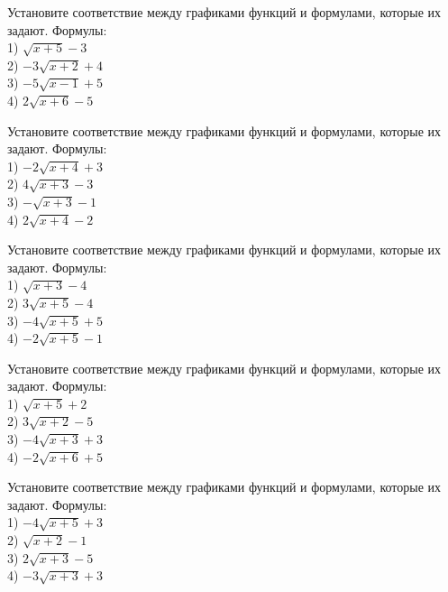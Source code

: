 \documentclass[4apaper]{article}
\begin{document}
\begin{taskBN}{56}
Установите соответствие между графиками функций и формулами, которые их задают. Формулы: \\1) $\sqrt{x+5}-3$\\2) $-3\sqrt{x+2}+4$\\3) $-5\sqrt{x-1}+5$\\4) $2\sqrt{x+6}-5$
\end{taskBN}

\begin{taskBN}{57}
Установите соответствие между графиками функций и формулами, которые их задают. Формулы: \\1) $-2\sqrt{x+4}+3$\\2) $4\sqrt{x+3}-3$\\3) $-\sqrt{x+3}-1$\\4) $2\sqrt{x+4}-2$
\end{taskBN}

\begin{taskBN}{58}
Установите соответствие между графиками функций и формулами, которые их задают. Формулы: \\1) $\sqrt{x+3}-4$\\2) $3\sqrt{x+5}-4$\\3) $-4\sqrt{x+5}+5$\\4) $-2\sqrt{x+5}-1$
\end{taskBN}

\begin{taskBN}{59}
Установите соответствие между графиками функций и формулами, которые их задают. Формулы: \\1) $\sqrt{x+5}+2$\\2) $3\sqrt{x+2}-5$\\3) $-4\sqrt{x+3}+3$\\4) $-2\sqrt{x+6}+5$
\end{taskBN}

\begin{taskBN}{60}
Установите соответствие между графиками функций и формулами, которые их задают. Формулы: \\1) $-4\sqrt{x+5}+3$\\2) $\sqrt{x+2}-1$\\3) $2\sqrt{x+3}-5$\\4) $-3\sqrt{x+3}+3$
\end{taskBN}
\end{document}

